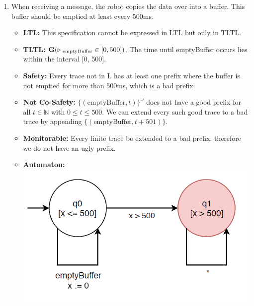 \documentclass[12pt]{article}
\begin{document}
\begin{enumerate}
\item When receiving a message, the robot copies the data over into a buffer. This buffer should be emptied at least every 500ms.
	\begin{itemize}
		\item \textbf{LTL:} This specification cannot be expressed in LTL but only in TLTL.
		\item \textbf{TLTL:} $\mathbf{G}(\triangleright \textsubscript{ emptyBuffer} \in [0, 500])$. The time until emptyBuffer occurs lies within the interval [0, 500].
		\item \textbf{Safety:} Every trace not in L has at least one prefix where the buffer is not emptied for more than 500ms, which is a bad prefix.
		\item \textbf{Not Co-Safety:} $\{( \text{emptyBuffer}, t)\}^ {\omega}$ does not have a good prefix for all $t \in \mathbb{N}$ with $0 \leq t \leq 500$. We can extend every such good trace to a bad trace by appending $\{( \text{emptyBuffer}, t + 501)\}$.
		\item \textbf{Monitorable:} Every finite trace be extended to a bad prefix, therefore we do not have an ugly prefix.
		\item \textbf{Automaton:} \\
			\includegraphics[scale = 0.5]{images/bufferAutomaton}
	\end{itemize}				

\end{enumerate}
\end{document}

